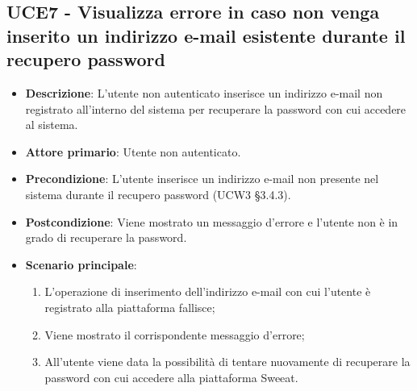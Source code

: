 \subsection{UCE7 - Visualizza errore in caso non venga inserito un indirizzo e-mail esistente durante il recupero password}
\begin{itemize}
\item \textbf{Descrizione}: L'utente non autenticato inserisce un indirizzo e-mail non registrato all'interno del sistema per recuperare la password con cui accedere al sistema.
\item \textbf{Attore primario}: Utente non autenticato.
\item \textbf{Precondizione}: L'utente inserisce un indirizzo e-mail non presente nel sistema durante il recupero password (UCW3 §3.4.3).
\item \textbf{Postcondizione}: Viene mostrato un messaggio d'errore e l'utente non è in grado di recuperare la password.

\item \textbf{Scenario principale}:
\begin{enumerate}
\item L'operazione di inserimento dell'indirizzo e-mail con cui l'utente è registrato alla piattaforma fallisce;
\item Viene mostrato il corrispondente messaggio d'errore;
\item All'utente viene data la possibilità di tentare nuovamente di recuperare la password con cui accedere alla piattaforma Sweeat.
\end{enumerate}
\end{itemize}